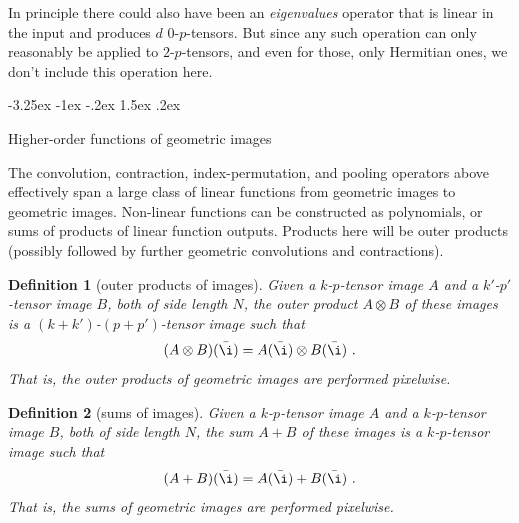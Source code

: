 \documentclass{article}
\makeatletter
\theoremstyle{plain}
\newtheorem{definition}{Definition}
\renewcommand\section{\@startsection {section}{1}{\z@}%
  {-3.25ex \@plus -1ex \@minus -.2ex}%
  {1.5ex \@plus .2ex}%
  {\raggedright\normalfont\large\bfseries}}%
\makeatother
\begin{document}
In principle there could also have been an \emph{eigenvalues} operator that is linear in the input and produces $d$ $0$-$p$-tensors.
But since any such operation can only reasonably be applied to $2$-$p$-tensors, and even for those, only Hermitian ones, we don't include this operation here.

\section{Higher-order functions of geometric images}\label{sec:nonlinear}

The convolution, contraction, index-permutation, and pooling operators above effectively span a large class of linear functions from geometric images to geometric images. Non-linear functions can be constructed as polynomials, or sums of products of linear function outputs.
Products here will be outer products (possibly followed by further geometric convolutions and contractions).

\begin{definition}[outer products of images]
Given a $k$-$p$-tensor image $A$ and a $k'$-$p'$-tensor image $B$, both of side length $N$, the outer product $A\otimes B$ of these images is a $(k+k')$-$(p+p')$-tensor image such that
\begin{equation}
    (A\otimes B)(\bar\i) = A(\bar\i)\otimes B(\bar\i) ~.
\end{equation}
That is, the outer products of geometric images are performed pixelwise.
\end{definition}

\begin{definition}[sums of images]
Given a $k$-$p$-tensor image $A$ and a $k$-$p$-tensor image $B$, both of side length $N$, the sum $A+B$ of these images is a $k$-$p$-tensor image such that
\begin{equation}
    (A+B)(\bar\i) = A(\bar\i)+B(\bar\i) ~.
\end{equation}
That is, the sums of geometric images are performed pixelwise.
\end{definition}
\end{document}
